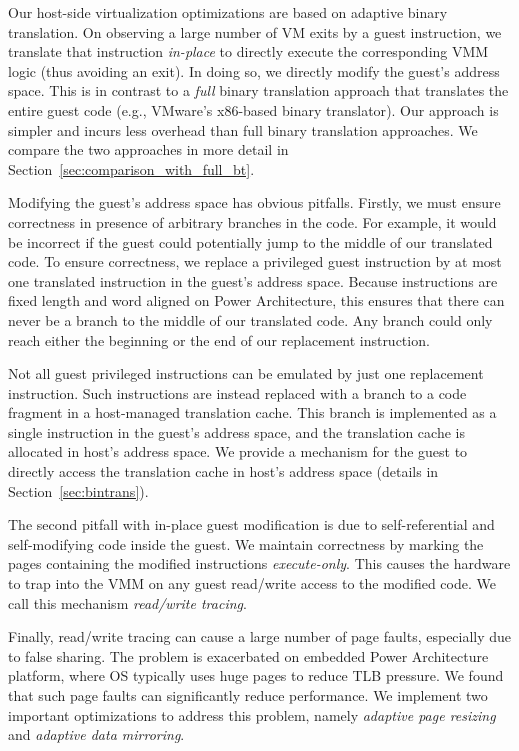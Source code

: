 \documentclass[10pt,twocolumn]{article}
\begin{document}
Our host-side virtualization optimizations are based on adaptive binary
translation. On observing a large number of VM exits by a guest instruction, we translate
that instruction {\em in-place} to directly execute the corresponding
VMM logic (thus avoiding an exit). In doing so, we directly modify the guest's
address space. This is in contrast to a {\em full} binary translation approach
that translates the entire guest code
(e.g., VMware's x86-based binary translator\cite{adams:asplos06}). Our approach is
simpler and incurs less overhead than full binary
translation approaches. We compare the two approaches in more detail in
Section~\ref{sec:comparison_with_full_bt}.

Modifying the guest's address space has obvious pitfalls.
Firstly, we must ensure correctness in presence
of arbitrary branches in the code. For example, it would be incorrect if the guest
could potentially jump to the middle of our translated code.
To ensure correctness, we replace a privileged guest instruction
by at most one translated instruction in the guest's address space. Because instructions
are fixed length and word aligned on Power Architecture, this ensures that
there can never be a branch to the middle of our translated
code. Any branch could only reach either the beginning or the end of our
replacement instruction.

Not all guest privileged instructions can be emulated by just one
replacement instruction.
Such instructions are instead replaced with a branch to a code
fragment in a host-managed translation cache. This branch is implemented as a
single instruction in the guest's address space, and the translation
cache is allocated in host's address space. We provide a mechanism for the guest
to directly access the translation cache in host's address
space (details in Section~\ref{sec:bintrans}).

The second pitfall with in-place guest modification is due to
self-referential and self-modifying code inside the guest. We maintain correctness by 
marking the pages containing the modified instructions {\em execute-only}. This
causes the hardware to trap into the VMM on any guest read/write access to the
modified code. We call this mechanism {\em read/write tracing}.

Finally, read/write tracing can cause a large number of
page faults, especially due to false sharing. The problem is
exacerbated on embedded Power Architecture platform, where OS typically uses
huge pages to reduce TLB pressure. We found that such page faults can
significantly reduce performance.
We implement two important optimizations to address this problem, namely
{\em adaptive page resizing} and {\em adaptive data mirroring}.
\end{document}

